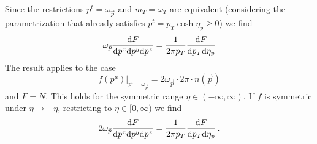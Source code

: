 Since the restrictions $p^t=\omega_{\vec{p}}$ and $m_T=\omega_T$ are equivalent (considering the parametrization that already satisfies $p^t=p_T\cosh\eta_p\geq 0$) we find
\begin{equation}
    \omega_{\vec{p}}\frac{\text{d} F}{\text{d} p^x\text{d} p^y\text{d} p^z}=\frac{1}{2\pi p_T}\frac{\text{d} F}{\text{d} p_T\text{d}\eta_p}
\end{equation}
The result applies to the case
\begin{equation}
    f(p^\mu)\big\vert_{p^t=\omega_{\vec{p}}}=2\omega_{\vec{p}}\cdot 2\pi\cdot n(\vec{p})
\end{equation}
and $F=N$. This holds for the symmetric range $\eta\in(-\infty,\infty)$. If $f$ is symmetric under ${\eta\to -\eta}$, restricting to $\eta\in[0,\infty)$ we find
\begin{equation}
    2\omega_{\vec{p}}\frac{\text{d} F}{\text{d} p^x\text{d} p^y\text{d} p^z}=\frac{1}{2\pi p_T}\frac{\text{d} F}{\text{d} p_T\text{d}\eta_p}\,.
\end{equation}